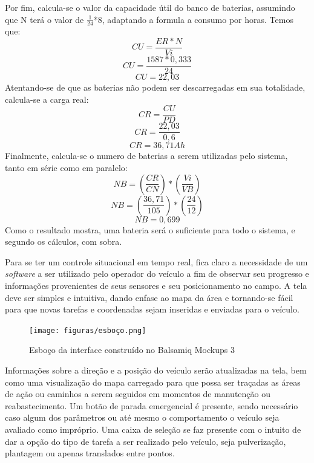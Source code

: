Por fim, calcula-se o valor da capacidade útil do banco de baterias, assumindo que N terá o valor de $\frac{1}{24}$*8, adaptando a formula a consumo por horas. Temos que:
\[CU=\frac{ER*N}{Vi}\]
\[CU=\frac{1587*0,333}{24}\]
\[CU=22,03\]
Atentando-se de que as baterias não podem ser descarregadas em sua totalidade, calcula-se a carga real:
\[CR=\frac{CU}{PD}\]
\[CR=\frac{22,03}{0,6}\]
\[CR=36,71Ah\]
Finalmente, calcula-se o numero de baterias a serem utilizadas pelo sistema, tanto em série como em paralelo:
\[NB=\left ( \frac{CR}{CN} \right )*\left ( \frac{Vi}{VB} \right )\]
\[NB=\left ( \frac{36,71}{105} \right )*\left ( \frac{24}{12} \right )\]
\[NB=0,699\]
Como o resultado mostra, uma bateria será o suficiente para todo o sistema, e segundo os cálculos, com sobra.

Para se ter um controle situacional em tempo real, fica claro a necessidade de um \textit{software} a ser utilizado pelo operador do veículo a fim de observar seu progresso e informações provenientes de seus sensores e seu posicionamento no campo. A tela deve ser simples e intuitiva, dando enfase ao mapa da área e tornando-se fácil para que novas tarefas e coordenadas sejam inseridas e enviadas para o veículo.

\begin{figure}[H]
    \centering
    \texttt{[image: figuras/esboço.png]}
    \caption{Esboço da interface construído no Balsamiq Mockups 3}
    \label{fig:balsamiq:esboco}
\end{figure}

Informações sobre a direção e a posição do veículo serão atualizadas na tela, bem como uma visualização do mapa carregado para que possa ser traçadas as áreas de ação  ou caminhos a serem seguidos em momentos de manutenção ou reabastecimento. Um botão de parada emergencial é presente, sendo necessário caso algum dos parâmetros ou até mesmo o comportamento o veículo seja avaliado como impróprio. Uma caixa de seleção se faz presente com o intuito de dar a opção do tipo de tarefa a ser realizado pelo veículo, seja pulverização, plantagem ou apenas translados entre pontos. 